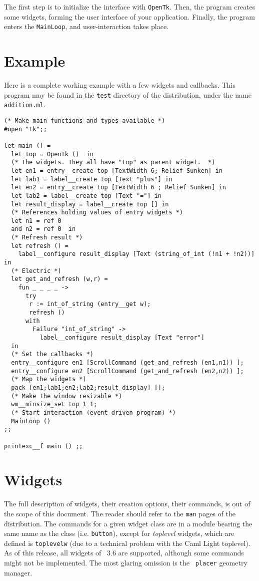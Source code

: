 The first step is to initialize the interface with \verb|OpenTk|.
Then, the program creates some widgets, forming the user interface of your
application. Finally, the program enters the \verb|MainLoop|, and
user-interaction takes place.

\section{Example}
Here is a complete working example with a few widgets and callbacks.
This program may be found in the \verb|test| directory of the distribution,
under the name \verb|addition.ml|.

\begin{verbatim}
(* Make main functions and types available *)
#open "tk";;

let main () =
  let top = OpenTk ()  in
  (* The widgets. They all have "top" as parent widget.  *)
  let en1 = entry__create top [TextWidth 6; Relief Sunken] in
  let lab1 = label__create top [Text "plus"] in
  let en2 = entry__create top [TextWidth 6 ; Relief Sunken] in
  let lab2 = label__create top [Text "="] in
  let result_display = label__create top [] in
  (* References holding values of entry widgets *)
  let n1 = ref 0
  and n2 = ref 0  in
  (* Refresh result *)
  let refresh () =
    label__configure result_display [Text (string_of_int (!n1 + !n2))]  in
  (* Electric *)
  let get_and_refresh (w,r) =
    fun _ _ _ _ ->
      try
       r := int_of_string (entry__get w);
       refresh ()
      with
        Failure "int_of_string" ->
          label__configure result_display [Text "error"]
  in
  (* Set the callbacks *)
  entry__configure en1 [ScrollCommand (get_and_refresh (en1,n1)) ];
  entry__configure en2 [ScrollCommand (get_and_refresh (en2,n2)) ];
  (* Map the widgets *)
  pack [en1;lab1;en2;lab2;result_display] [];
  (* Make the window resizable *)
  wm__minsize_set top 1 1;
  (* Start interaction (event-driven program) *)
  MainLoop ()
;;

printexc__f main () ;;
\end{verbatim}


\section{Widgets}
The full description of widgets, their creation options, their commands, is
out of the scope of this document. The reader should refer to the \verb|man|
pages of the distribution. The commands for a given widget class are in 
a module bearing the same name as the class (i.e. \verb|button|), except
for {\em toplevel} widgets, which are defined is \verb|toplevelw| (due to a 
technical problem with the Caml Light toplevel).
As of this release, all widgets of \tk\ 3.6 are supported, although some
commands might not be implemented. The most glaring omission is the {\tt
placer} geometry manager.

